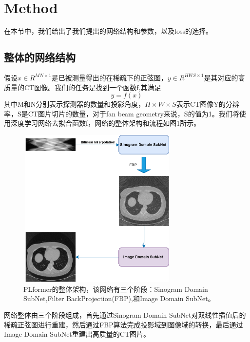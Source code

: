 \section{Method}
在本节中，我们给出了我们提出的网络结构和参数，以及loss的选择。
\subsection{整体的网络结构}
假设$x\in R^{MN \times{1}}$是已被测量得出的在稀疏下的正弦图，$y\in R^{HWS\times{1}}$是其对应的高质量的CT图像。我们的任务是找到一个函数f,其满足\begin{equation}y = f(x)\end{equation}其中M和N分别表示探测器的数量和投影角度，$H\times{W}\times{S}$表示CT图像Y的分辨率，S是CT图片切片的数量，对于fan beam geometry来说，S的值为1。我们将使用深度学习网络去拟合函数f，网络的整体架构和流程如图1所示。 \par
\begin{figure}
	\centering
	\includegraphics[height=8cm,width=8cm]{1.eps}
	\caption{PLformer的整体架构，该网络有三个阶段：Sinogram Domain SubNet,Filter BackProjection(FBP),和Image Domain SubNet。}
	\label{fig1}
\end{figure}
网络整体由三个阶段组成，首先通过Sinogram Domain SubNet对双线性插值后的稀疏正弦图进行重建，然后通过FBP算法完成投影域到图像域的转换，最后通过Image Domain SubNet重建出高质量的CT图片。
